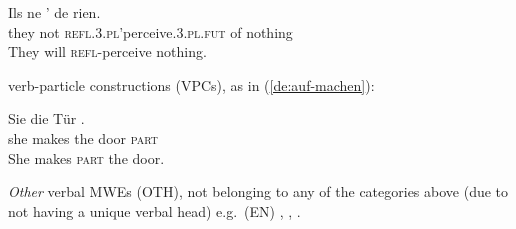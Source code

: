 \documentclass[output=paper,modfonts]{langscibook}
\begin{document}
\begin{senum}
\begin{senum}
\ea \label{fr:se-apercevoir}
\settowidth {} 
\gll Ils ne ' de rien. \\
they not \textsc{refl.3.pl}'perceive.\textsc{3.pl.fut} of nothing \\ 
\glt They will \textsc{refl}-perceive nothing. 
\z

\item verb-particle constructions (VPCs), as in (\ref{de:auf-machen}):

\ea \label{de:auf-machen}
\settowidth {} 
\gll Sie  die Tür . \\
she makes the door \textsc{part} \\ 
\glt She makes \textsc{part} the door. 
\z

\end{senum}
\item \textit{Other} verbal MWEs (OTH), not belonging to any of the categories above (due to not having a unique verbal head) e.g.\ (EN) , , .
\end{senum}
\end{document}
